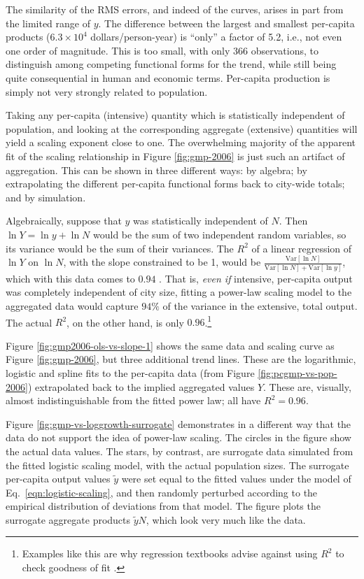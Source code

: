 \documentclass{pnastwo}
\begin{document}
\begin{article}
The similarity of the RMS errors, and indeed of the curves, arises in part from
the limited range of $y$.  The difference between the largest and smallest
per-capita products ($6.3\times{10}^4$ dollars/person-year) is ``only'' a
factor of 5.2, i.e., not even one order of magnitude.  This is too small, with
only 366 observations, to distinguish among competing functional forms for the
trend, while still being quite consequential in human and economic terms.
Per-capita production is simply not very strongly related to population.

Taking any per-capita (intensive) quantity which is statistically independent
of population, and looking at the corresponding aggregate (extensive)
quantities will yield a scaling exponent close to one.  The overwhelming
majority of the apparent fit of the scaling relationship in Figure
\ref{fig:gmp-2006} is just such an artifact of aggregation.  This can be shown
in three different ways: by algebra; by extrapolating the different per-capita
functional forms back to city-wide totals; and by simulation.

Algebraically, suppose that $y$ was statistically independent of $N$.  Then
$\ln{Y} = \ln{y} + \ln{N}$ would be the sum of two independent random
variables, so its variance would be the sum of their variances.  The $R^2$ of a
linear regression of $\ln{Y}$ on $\ln{N}$, with the slope constrained to be 1,
would be $\frac{\mathrm{Var}[\ln{N}]}{\mathrm{Var}[\ln{N}] +
  \mathrm{Var}[\ln{y}]}$, which with this data comes to $0.94$
\cite{Wasserman-all-of-stats}.  That is, {\em even if} intensive, per-capita
output was completely independent of city size, fitting a power-law scaling
model to the aggregated data would capture $94\%$ of the variance in the
extensive, total output.  The actual $R^2$, on the other hand, is only
$0.96$.\footnote{Examples like this are why regression textbooks advise against
  using $R^2$ to check goodness of fit
  \cite{Birnbaum-devil-rides-again,Anderson-Shanteau-weak-inference,Berk-on-regression}.}

Figure \ref{fig:gmp2006-ols-vs-slope-1} shows the same data and scaling curve
as Figure \ref{fig:gmp-2006}, but three additional trend lines.  These are the
logarithmic, logistic and spline fits to the per-capita data (from Figure
\ref{fig:pcgmp-vs-pop-2006}) extrapolated back to the implied aggregated values
$Y$.  These are, visually, almost indistinguishable from the fitted power law;
all have $R^2 = 0.96$.

Figure \ref{fig:gmp-vs-loggrowth-surrogate} demonstrates in a different way
that the data do not support the idea of power-law scaling.  The circles in the
figure show the actual data values.  The stars, by contrast, are surrogate data
simulated from the fitted logistic scaling model, with the actual population
sizes.  The surrogate per-capita output values $\tilde{y}$ were set equal to
the fitted values under the model of Eq.\ \ref{eqn:logistic-scaling}, and then
randomly perturbed according to the empirical distribution of deviations from
that model.  The figure plots the surrogate aggregate products $\tilde{y}N$,
which look very much like the data.


\end{article}
\end{document}
